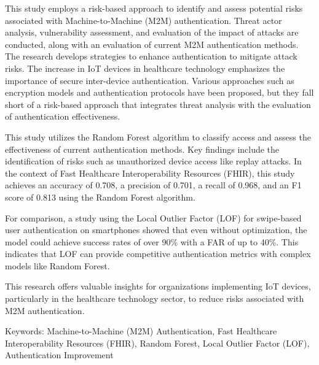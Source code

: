 This study employs a risk-based approach to identify and assess potential risks associated with Machine-to-Machine (M2M) authentication. Threat actor analysis, vulnerability assessment, and evaluation of the impact of attacks are conducted, along with an evaluation of current M2M authentication methods. The research develops strategies to enhance authentication to mitigate attack risks. The increase in IoT devices in healthcare technology emphasizes the importance of secure inter-device authentication. Various approaches such as encryption models and authentication protocols have been proposed, but they fall short of a risk-based approach that integrates threat analysis with the evaluation of authentication effectiveness.

This study utilizes the Random Forest algorithm to classify access and assess the effectiveness of current authentication methods. Key findings include the identification of risks such as unauthorized device access like replay attacks. In the context of Fast Healthcare Interoperability Resources (FHIR), this study achieves an accuracy of 0.708, a precision of 0.701, a recall of 0.968, and an F1 score of 0.813 using the Random Forest algorithm.

For comparison, a study using the Local Outlier Factor (LOF) for swipe-based user authentication on smartphones showed that even without optimization, the model could achieve success rates of over 90\% with a FAR of up to 40\%. This indicates that LOF can provide competitive authentication metrics with complex models like Random Forest.

This research offers valuable insights for organizations implementing IoT devices, particularly in the healthcare technology sector, to reduce risks associated with M2M authentication.

Keywords: Machine-to-Machine (M2M) Authentication, Fast Healthcare Interoperability Resources (FHIR), Random Forest, Local Outlier Factor (LOF), Authentication Improvement